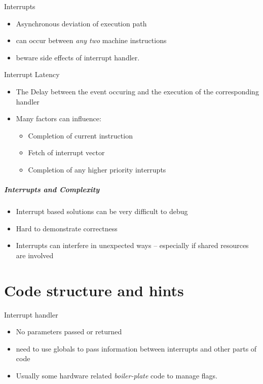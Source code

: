 \documentclass[svgnames,x11names]{beamer}
\begin{document}
\begin{frame}{Interrupts}
  \begin{itemize}
  \item \alert{Asynchronous} deviation of execution path
  \item can occur between \emph{any two} machine instructions
  \item beware side effects of interrupt handler.
  \end{itemize}

  \begin{block}{Interrupt Latency}
  \begin{itemize}
  \item The Delay between the event occuring and the execution of the
    corresponding handler
  \item Many factors can influence:
    \begin{itemize}
    \item Completion of current instruction
    \item Fetch of interrupt vector
    \item Completion of any higher priority interrupts
    \end{itemize}
  \end{itemize}
\end{block}
\end{frame}
\begin{frame}
  \frametitle{Interrupts and Complexity}
  \begin{itemize}
  \item Interrupt based solutions can be \alert{very} difficult to
    debug
  \item Hard to demonstrate correctness
  \item Interrupts can interfere in unexpected ways -- especially if
    shared resources are involved
  \end{itemize}
\end{frame}
\part{Code structure and hints}
\frame\partpage

\begin{frame}{Interrupt handler}
  \begin{itemize}
  \item \alert{No} parameters passed or returned
  \item need to use \alert{globals} to pass information between
    interrupts and other parts of code
  \item Usually some hardware related \emph{boiler-plate} code to
    manage flags.
  \end{itemize}
\end{frame}
\end{document}
